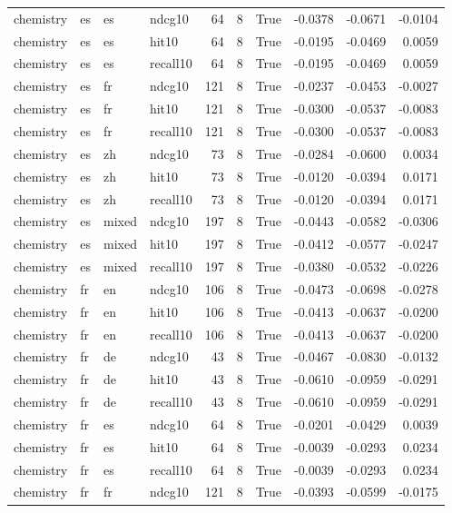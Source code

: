 \begin{tabular}{llllrrrrrr}
chemistry & es & es & ndcg10 & 64 & 8 & True & -0.0378 & -0.0671 & -0.0104 \\
chemistry & es & es & hit10 & 64 & 8 & True & -0.0195 & -0.0469 & 0.0059 \\
chemistry & es & es & recall10 & 64 & 8 & True & -0.0195 & -0.0469 & 0.0059 \\
chemistry & es & fr & ndcg10 & 121 & 8 & True & -0.0237 & -0.0453 & -0.0027 \\
chemistry & es & fr & hit10 & 121 & 8 & True & -0.0300 & -0.0537 & -0.0083 \\
chemistry & es & fr & recall10 & 121 & 8 & True & -0.0300 & -0.0537 & -0.0083 \\
chemistry & es & zh & ndcg10 & 73 & 8 & True & -0.0284 & -0.0600 & 0.0034 \\
chemistry & es & zh & hit10 & 73 & 8 & True & -0.0120 & -0.0394 & 0.0171 \\
chemistry & es & zh & recall10 & 73 & 8 & True & -0.0120 & -0.0394 & 0.0171 \\
chemistry & es & mixed & ndcg10 & 197 & 8 & True & -0.0443 & -0.0582 & -0.0306 \\
chemistry & es & mixed & hit10 & 197 & 8 & True & -0.0412 & -0.0577 & -0.0247 \\
chemistry & es & mixed & recall10 & 197 & 8 & True & -0.0380 & -0.0532 & -0.0226 \\
chemistry & fr & en & ndcg10 & 106 & 8 & True & -0.0473 & -0.0698 & -0.0278 \\
chemistry & fr & en & hit10 & 106 & 8 & True & -0.0413 & -0.0637 & -0.0200 \\
chemistry & fr & en & recall10 & 106 & 8 & True & -0.0413 & -0.0637 & -0.0200 \\
chemistry & fr & de & ndcg10 & 43 & 8 & True & -0.0467 & -0.0830 & -0.0132 \\
chemistry & fr & de & hit10 & 43 & 8 & True & -0.0610 & -0.0959 & -0.0291 \\
chemistry & fr & de & recall10 & 43 & 8 & True & -0.0610 & -0.0959 & -0.0291 \\
chemistry & fr & es & ndcg10 & 64 & 8 & True & -0.0201 & -0.0429 & 0.0039 \\
chemistry & fr & es & hit10 & 64 & 8 & True & -0.0039 & -0.0293 & 0.0234 \\
chemistry & fr & es & recall10 & 64 & 8 & True & -0.0039 & -0.0293 & 0.0234 \\
chemistry & fr & fr & ndcg10 & 121 & 8 & True & -0.0393 & -0.0599 & -0.0175 \\

\end{tabular}
